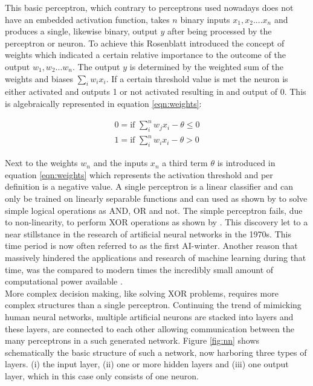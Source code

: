 This basic perceptron, which contrary to perceptrons used nowadays does not have an embedded activation
function, takes $n$ binary inputs $x_1 , x_2 .... x_n$ and produces a single, likewise binary, output $y$
after being processed by the perceptron or neuron. To achieve this Rosenblatt introduced the concept of
weights which indicated a certain relative importance to the outcome of the output $w_1 , w_2 ... w_n$. The
output $y$ is determined by the weighted sum of the weights and biases $\sum_i w_ix_i $. If a certain
threshold value is met the neuron is either activated and outputs 1 or not activated resulting in and output
of 0. This is algebraically represented in equation \ref{eqn:weights}:

\begin{subequations}
 \begin{align}
   0 = \mbox{if } \sum_i^n w_j x_i - \theta \leq 0 \\
   1 = \mbox{if } \sum_i^n w_i x_i - \theta > 0
 \end{align}
 \label{eqn:weights}
\end{subequations}

Next to the weights $w_n$ and the inputs $x_n$ a third term $\theta$ is introduced in equation
\ref{eqn:weights} which represents the activation threshold and per definition is a negative value. A single
perceptron is a linear classifier and can only be trained on linearly separable functions and can used as
shown by \cite{rosenblatt1961} to solve simple logical operations as AND, OR and not. The simple perceptron
fails, due to non-linearity, to perform XOR operations as shown by \cite{marvin1969}. This discovery let to a
near stillstance in the research of artificial neural networks in the 1970s. This time period is now often
referred to as the first AI-winter. Another reason that massively hindered the applications and research of
machine learning during that time, was the compared to
modern times the incredibly small amount of computational power available \cite{nguyen1990truck}. \\
More complex decision making, like solving XOR problems, requires more complex structures than a single
perceptron. Continuing the trend of mimicking human neural networks, multiple artificial neurons are stacked
into layers and these layers, are connected to each other allowing communication between the many perceptrons
in a such generated network. Figure \ref{fig:nn} shows schematically the basic structure of such a network,
now harboring three types of layers. (i) the input layer, (ii) one or more hidden layers and (iii) one output
layer, which in this case only consists of one neuron.

